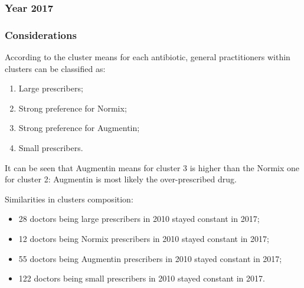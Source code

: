 \subsubsection{Year 2017}
\begin{center}
	\begin{table}[h]
\caption{\small $k$-means with 4 clusters, 2017}
\vspace{-30px}
\end{table}
\end{center}

\subsubsection{Considerations}
According to the cluster means for each antibiotic, general practitioners within clusters can be classified as:
\begin{enumerate}
	\item Large prescribers;
	\item Strong preference for Normix;
	\item Strong preference for Augmentin;
	\item Small prescribers.
\end{enumerate}

It can be seen that Augmentin means for cluster 3 is higher than the Normix one for cluster 2: Augmentin is most likely the over-prescribed drug.

Similarities in clusters composition:
\begin{itemize}
	\item 28 doctors being large prescribers in 2010 stayed constant in 2017;
	\item 12 doctors being Normix prescribers in 2010 stayed constant in 2017;
	\item 55 doctors being Augmentin prescribers in 2010 stayed constant in 2017;
	\item 122 doctors being small prescribers in 2010 stayed constant in 2017.
\end{itemize}

